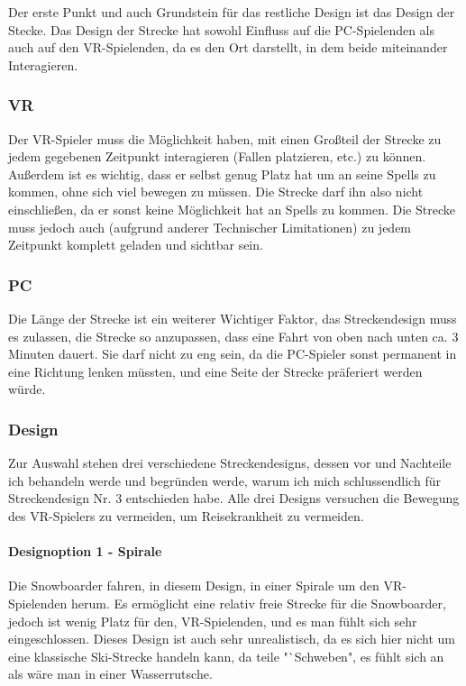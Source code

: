 Der erste Punkt und auch Grundstein für das restliche Design ist das Design der Stecke. Das Design der Strecke hat sowohl Einfluss auf die PC-Spielenden als auch auf den VR-Spielenden, da es den Ort darstellt, in dem beide miteinander Interagieren.

\subsubsection{VR}

Der VR-Spieler muss die Möglichkeit haben, mit einen Großteil der Strecke zu jedem gegebenen Zeitpunkt interagieren (Fallen platzieren, etc.) zu können. Außerdem ist es wichtig, dass er selbst genug Platz hat um an seine Spells zu kommen, ohne sich viel bewegen zu müssen. Die Strecke darf ihn also nicht einschließen, da er sonst keine Möglichkeit hat an Spells zu kommen. Die Strecke muss jedoch auch (aufgrund anderer Technischer Limitationen) zu jedem Zeitpunkt komplett geladen und sichtbar sein.

\subsubsection{PC}

Die Länge der Strecke ist ein weiterer Wichtiger Faktor, das Streckendesign muss es zulassen, die Strecke so anzupassen, dass eine Fahrt von oben nach unten ca. 3 Minuten dauert. Sie darf nicht zu eng sein, da die PC-Spieler sonst permanent in eine Richtung lenken müssten, und eine Seite der Strecke präferiert werden würde.

\subsubsection{Design}

Zur Auswahl stehen drei verschiedene Streckendesigns, dessen vor und Nachteile ich behandeln werde und begründen werde, warum ich mich schlussendlich für Streckendesign Nr. 3 entschieden habe. Alle drei Designs versuchen die Bewegung des VR-Spielers zu vermeiden, um Reisekrankheit zu vermeiden.

\paragraph{Designoption 1 - Spirale}

Die Snowboarder fahren, in diesem Design, in einer Spirale um den VR-Spielenden herum. Es ermöglicht eine relativ freie Strecke für die Snowboarder, jedoch ist wenig Platz für den, VR-Spielenden, und es man fühlt sich sehr eingeschlossen. Dieses Design ist auch sehr unrealistisch, da es sich hier nicht um eine klassische Ski-Strecke handeln kann, da teile "`Schweben", es fühlt sich an als wäre man in einer Wasserrutsche.

